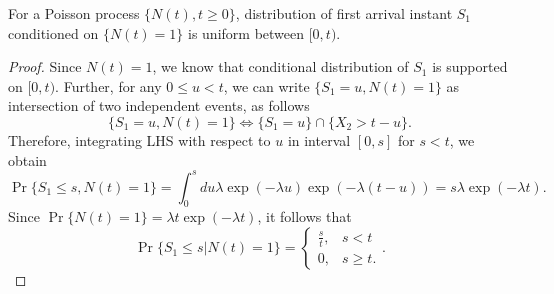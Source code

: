 \documentclass[a4paper,10pt,english]{article}
\begin{document}
\begin{prop} For a Poisson process $\{N(t), t\geqslant 0\}$, distribution of first arrival instant $S_1$ conditioned on $\{N(t)=1\}$ is uniform between $[0,t)$.
\end{prop}
\begin{proof} Since $N(t) = 1$, we know that conditional distribution of $S_1$ is supported on $[0,t)$. Further, for any $0 \leq u < t$, we can write $\{S_1 = u, N(t) = 1\}$ as intersection of two independent events, as follows
\begin{equation*}
\{S_1 = u, N(t) = 1\} \iff \{S_1 = u\}\cap\{X_2 > t - u\}.
\end{equation*}
Therefore, integrating LHS with respect to $u$ in interval $[0,s]$ for $s < t$, we obtain
\begin{equation*}
\Pr\{S_1 \leq s, N(t) = 1\} = \int_{0}^{s}du \lambda \exp(-\lambda u)\exp(-\lambda (t-u)) = s\lambda\exp(-\lambda t).
\end{equation*}
Since $\Pr\{N(t) = 1\} = \lambda t \exp(-\lambda t)$, it follows that 
\begin{equation*}
\Pr\{S_1 \leq s| N(t) = 1\} = \begin{cases}\frac{s}{t}, & s < t\\ 0, & s \geq t.\end{cases}.
\end{equation*}
\end{proof}
\end{document}
